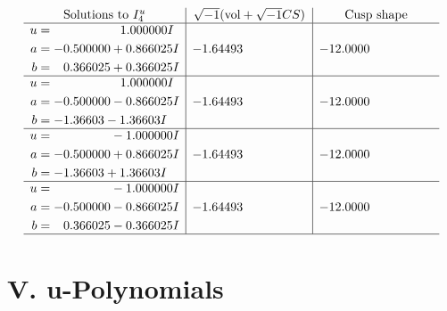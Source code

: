 \documentclass[1p]{elsarticle_modified}
\theoremstyle{definition}
\newcommand{\I}{\sqrt{-1}}
\begin{document}
$$\begin{array}{c|c|c}  
\text{Solutions to }I^u_{4}& \I (\text{vol} + \sqrt{-1}CS) & \text{Cusp shape}\\
 \hline 
\begin{aligned}
u &= \phantom{-0.000000 -}1.000000 I \\
a &= -0.500000 + 0.866025 I \\
b &= \phantom{-}0.366025 + 0.366025 I\end{aligned}
 & -1.64493\phantom{ +0.000000I} & -12.0000\phantom{ +0.000000I} \\ \hline\begin{aligned}
u &= \phantom{-0.000000 -}1.000000 I \\
a &= -0.500000 - 0.866025 I \\
b &= -1.36603 - 1.36603 I\end{aligned}
 & -1.64493\phantom{ +0.000000I} & -12.0000\phantom{ +0.000000I} \\ \hline\begin{aligned}
u &= \phantom{-0.000000 } -1.000000 I \\
a &= -0.500000 + 0.866025 I \\
b &= -1.36603 + 1.36603 I\end{aligned}
 & -1.64493\phantom{ +0.000000I} & -12.0000\phantom{ +0.000000I} \\ \hline\begin{aligned}
u &= \phantom{-0.000000 } -1.000000 I \\
a &= -0.500000 - 0.866025 I \\
b &= \phantom{-}0.366025 - 0.366025 I\end{aligned}
 & -1.64493\phantom{ +0.000000I} & -12.0000\phantom{ +0.000000I}\\
 \hline 
 \end{array}$$\newpage
\newpage\renewcommand{\arraystretch}{1}
\centering \section*{ V. u-Polynomials}
\end{document}
